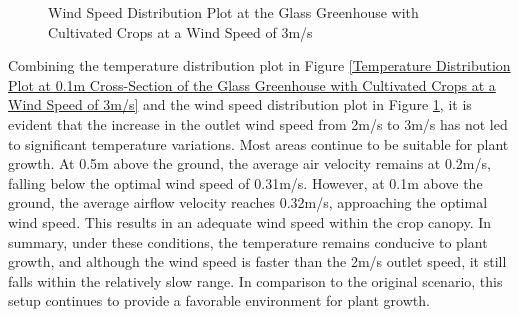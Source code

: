 \documentclass{apmcmthesis}
\begin{document}
{\begin{figure}[htbp]
{      }
       \caption{Wind Speed Distribution Plot at the Glass Greenhouse with Cultivated Crops at a Wind Speed of 3m/s}
        \label{Wind Speed Distribution Plot at Cross-Section of the Glass Greenhouse with Cultivated Crops at a Wind Speed of 3m/s}
  \end{figure}
  
Combining the temperature distribution plot in Figure \ref{Temperature Distribution Plot at 0.1m Cross-Section of the Glass Greenhouse with Cultivated Crops at a Wind Speed of 3m/s} and the wind speed distribution plot in Figure \ref{Wind Speed Distribution Plot at Cross-Section of the Glass Greenhouse with Cultivated Crops at a Wind Speed of 3m/s}, it is evident that the increase in the outlet wind speed from 2m/s to 3m/s has not led to significant temperature variations. Most areas continue to be suitable for plant growth. At 0.5m above the ground, the average air velocity remains at 0.2m/s, falling below the optimal wind speed of 0.31m/s. However, at 0.1m above the ground, the average airflow velocity reaches 0.32m/s, approaching the optimal wind speed. This results in an adequate wind speed within the crop canopy. In summary, under these conditions, the temperature remains conducive to plant growth, and although the wind speed is faster than the 2m/s outlet speed, it still falls within the relatively slow range. In comparison to the original scenario, this setup continues to provide a favorable environment for plant growth.




}
\end{document}
